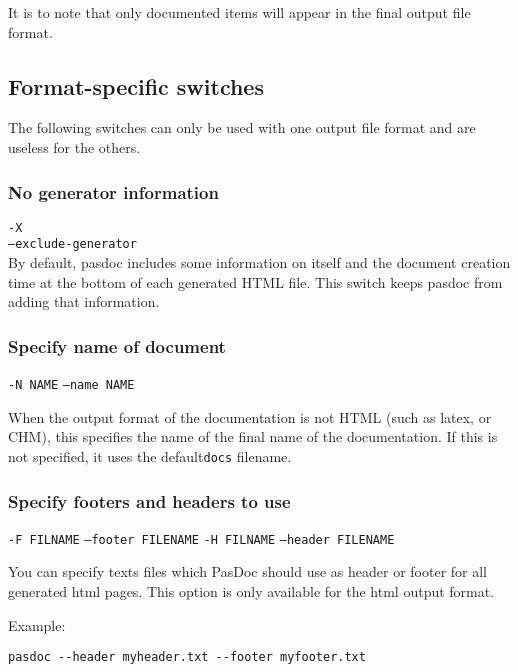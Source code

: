\documentclass[11pt]{article}
\begin{document}
It is to note that only documented items will appear in the final
output file format.


\subsection{Format-specific switches}

The following switches can only be used with one output file format
and are useless for the others.

\subsubsection{No generator information}

{\tt -X}\\
{\tt --exclude-generator}\\

By default, pasdoc includes some information on itself and the document
creation time at the bottom of each generated HTML file.
This switch keeps pasdoc from adding that information.

\subsubsection{Specify name of document}
{\tt -N NAME}
{\tt --name NAME}

When the output format of the documentation is not
HTML (such as latex, or CHM), this specifies the
name of the final name of the documentation. If this
is not specified, it uses the default{\tt  docs} 
filename.



\subsubsection{Specify footers and headers to use}

{\tt -F FILNAME}
{\tt --footer FILENAME}
{\tt -H FILNAME}
{\tt --header FILENAME}

You can specify texts files which PasDoc should use as header or footer 
for all generated html pages. This option is only available for
the html output format.

Example:
\begin{verbatim}
pasdoc --header myheader.txt --footer myfooter.txt
\end{verbatim}
\end{document}
